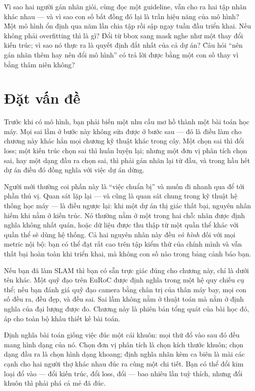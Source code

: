 \documentclass[../../deep_learning.tex]{subfiles}
\begin{document}
\begin{khoigoi}
\h{Vì sao hai người gán nhãn giỏi, cùng đọc một guideline, vẫn cho ra hai tập nhãn khác nhau --- và vì sao con số bất đồng đó lại là trần hiệu năng của mô hình?}
\h{Một mô hình ổn định qua năm lần chia tập rồi sập ngay tuần đầu triển khai. Nếu không phải overfitting thì là gì?}
\h{Đổi từ bbox sang mask nghe như một thay đổi kiến trúc; vì sao nó thực ra là quyết định đắt nhất của cả dự án?}
\h{Câu hỏi ``nên gán nhãn thêm hay nên đổi mô hình'' có trả lời được bằng một con số thay vì bằng thâm niên không?}
\end{khoigoi}

\section{Đặt vấn đề}
Trước khi có mô hình, bạn phải biến một nhu cầu mơ hồ thành một bài toán học máy. Mọi sai lầm ở bước này không sửa được ở bước sau --- đó là điều làm cho chương này khác hẳn mọi chương kỹ thuật khác trong cây. Một  chọn sai thì đổi loss; một kiến trúc chọn sai thì huấn luyện lại; nhưng một đơn vị phân tích chọn sai, hay một dạng đầu ra chọn sai, thì phải gán nhãn lại từ đầu, và trong hầu hết dự án điều đó đồng nghĩa với việc dự án dừng.

Người mới thường coi phần này là ``việc chuẩn bị'' và muốn đi nhanh qua để tới phần thú vị. Quan sát lặp lại --- và cũng là quan sát chung trong kỹ thuật hệ thống học máy \cite{sculley2015hidden} --- là điều ngược lại: khi một dự án thị giác thất bại, nguyên nhân hiếm khi nằm ở kiến trúc. Nó thường nằm ở một trong hai chỗ: nhãn được định nghĩa không nhất quán, hoặc dữ liệu được thu thập từ một quần thể khác với quần thể sẽ dùng hệ thống. Cả hai nguyên nhân này đều \emph{vô hình} đối với mọi metric nội bộ: bạn có thể đạt  rất cao trên tập kiểm thử của chính mình và vẫn thất bại hoàn toàn khi triển khai, mà không con số nào trong bảng cảnh báo bạn.

Nếu bạn đã làm  SLAM thì bạn có sẵn trực giác đúng cho chương này, chỉ là dưới tên khác. Một quỹ đạo  trên EuRoC được định nghĩa trong một hệ quy chiếu cụ thể; nếu bạn đánh giá quỹ đạo camera bằng chân trị của thân máy bay, mọi con số đều ra, đều đẹp, và đều sai. Sai lầm không nằm ở thuật toán mà nằm ở định nghĩa của đại lượng được đo. Chương này là phiên bản tổng quát của bài học đó, áp cho toàn bộ khâu thiết kế bài toán.

\begin{trucgiac}
Định nghĩa bài toán giống việc đúc một cái khuôn: mọi thứ đổ vào sau đó đều mang hình dạng của nó. Chọn đơn vị phân tích là chọn kích thước khuôn; chọn dạng đầu ra là chọn hình dạng khoang; định nghĩa nhãn kèm ca biên là mài các cạnh cho hai người thợ khác nhau đúc ra cùng một chi tiết. Bạn có thể đổi kim loại đổ vào --- đổi kiến trúc, đổi loss, đổi  --- bao nhiêu lần tuỳ thích, nhưng đổi khuôn thì phải phá cả mẻ đã đúc.
\end{trucgiac}
\end{document}
